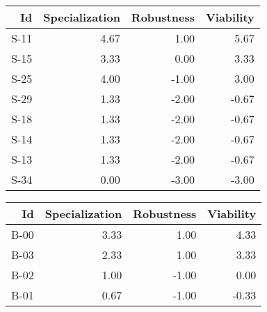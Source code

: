 


\begin{tabular}{ | r | r | r | r | }
    \hline
                    Id  &  Specialization  &      Robustness  &       Viability  \\
    \hline
    \hline
                  S-11  &            4.67  &            1.00  &            5.67  \\
    \hline
                  S-15  &            3.33  &            0.00  &            3.33  \\
    \hline
                  S-25  &            4.00  &           -1.00  &            3.00  \\
    \hline
                  S-29  &            1.33  &           -2.00  &           -0.67  \\
    \hline
                  S-18  &            1.33  &           -2.00  &           -0.67  \\
    \hline
                  S-14  &            1.33  &           -2.00  &           -0.67  \\
    \hline
                  S-13  &            1.33  &           -2.00  &           -0.67  \\
    \hline
                  S-34  &            0.00  &           -3.00  &           -3.00  \\
    \hline
\end{tabular}


\begin{tabular}{ | r | r | r | r | }
    \hline
                    Id  &  Specialization  &      Robustness  &       Viability  \\
    \hline
    \hline
                  B-00  &            3.33  &            1.00  &            4.33  \\
    \hline
                  B-03  &            2.33  &            1.00  &            3.33  \\
    \hline
                  B-02  &            1.00  &           -1.00  &            0.00  \\
    \hline
                  B-01  &            0.67  &           -1.00  &           -0.33  \\
    \hline
\end{tabular}


